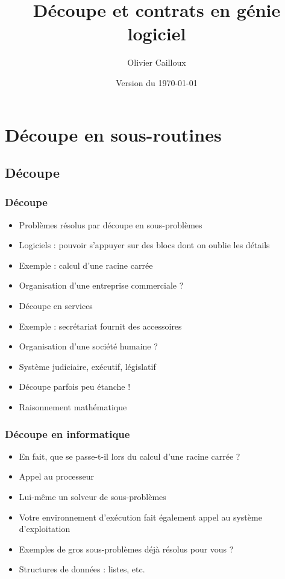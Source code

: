 \documentclass[english, french]{beamer}
\title{Découpe et contrats en génie logiciel}
\subtitle{}
\author{Olivier Cailloux}
\institute[LAMSADE]{LAMSADE, Université Paris-Dauphine}
\date{Version du \today}
\begin{document}


\begin{frame}[plain]
   \titlepage
\end{frame}
\addtocounter{framenumber}{-1}

\section{Découpe en sous-routines}
\subsection{Découpe}
\begin{frame}
	\frametitle{Découpe}
	\begin{itemize}
		\item Problèmes résolus par découpe en sous-problèmes
		\item Logiciels : pouvoir s’appuyer sur des blocs dont on oublie les détails
		\item Exemple : calcul d’une racine carrée
		\item Organisation d’une entreprise commerciale ? \pause
		\item Découpe en services
		\item Exemple : secrétariat fournit des accessoires
		\item Organisation d’une société humaine ? \pause
		\item Système judiciaire, exécutif, législatif
		\item Découpe parfois peu étanche !
		\item Raisonnement mathématique
	\end{itemize}
\end{frame}

\begin{frame}
	\frametitle{Découpe en informatique}
	\begin{itemize}
		\item En fait, que se passe-t-il lors du calcul d’une racine carrée ? \pause
		\item Appel au processeur
		\item Lui-même un solveur de sous-problèmes
		\item Votre environnement d’exécution fait également appel au système d’exploitation
		\item Exemples de gros sous-problèmes déjà résolus pour vous ? \pause
		\item Structures de données : listes, etc.
	\end{itemize}
\end{frame}
\end{document}
